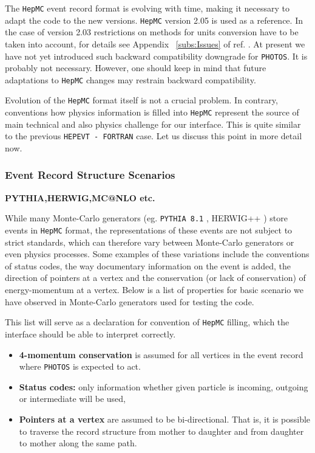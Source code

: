 \documentclass[]{Photos_interface_design}
\begin{document}
The {\tt HepMC} event record format is  evolving with time, making it necessary
 to adapt
the code to the new versions.
{\tt HepMC} version 2.05 is used as a reference. In the case of version 2.03 restrictions on methods for 
units
conversion have to be taken into account, for details see Appendix ~\ref{subs:Issues}
of ref. \cite{Davidson:2010rw}. At present we have not yet introduced such 
backward compatibility downgrade for {\tt PHOTOS}. It is probably not necessary.
However,
one should keep in mind that future adaptations to {\tt HepMC} changes may restrain
backward compatibility.

Evolution of the {\tt HepMC} format itself is not a crucial problem.
In contrary, conventions how physics information is  filled into {\tt HepMC}
 represent the source of main technical and also physics 
challenge for our interface. 
This is quite similar to the previous
{\tt HEPEVT - FORTRAN} case. Let us discuss this point in more detail now.

\subsubsection{Event Record Structure Scenarios}

{\bf PYTHIA,HERWIG,MC@NLO etc. }

While many Monte-Carlo generators (eg. {\tt PYTHIA 8.1} \cite{Sjostrand:2007gs}, 
HERWIG++ \cite{Bahr:2008pv})
store events in {\tt HepMC} format, the  representations of
these events are not subject to strict standards,  which can therefore
vary between Monte-Carlo generators or even physics processes. Some examples
of these variations include the conventions of status codes, the  way
documentary information on the event is added, the direction of pointers at a vertex
and the conservation (or lack of conservation) of energy-momentum at a vertex.
Below is a list of properties for basic scenario we have observed in Monte-Carlo
generators used for testing the code.

This list will serve as a declaration for convention of  {\tt HepMC} filling, which  the 
interface should  be able to interpret correctly.

\begin{itemize}
  \item \textbf{4-momentum conservation} is assumed for all vertices in the event record where {\tt PHOTOS} is expected to act.
  \item \textbf{Status codes:} only information whether given particle is incoming, outgoing or intermediate will be used,
  \item \textbf{Pointers at a vertex} are assumed to be bi-directional. That is, it is possible to traverse the record structure from mother to daughter and from daughter to mother along the same path.
\end{itemize}
\end{document}
